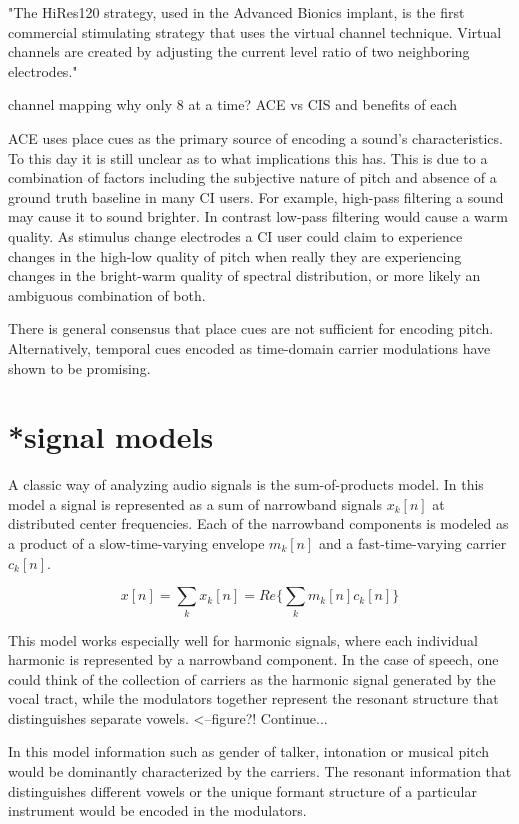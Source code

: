\documentclass [11pt, proquest] {uwthesis}[2015/03/03]
\begin{document}
"The HiRes120 strategy, used in the Advanced Bionics implant, is the first commercial stimulating strategy that uses the virtual channel technique. Virtual channels are created by adjusting the current level ratio of two neighboring electrodes."

channel mapping
	why only 8 at a time?
	ACE vs CIS and benefits of each
	
	
	
	ACE uses place cues as the primary source of encoding a sound's characteristics.  To this day it is still unclear as to what implications this has.  This is due to a combination of factors including the subjective nature of pitch and absence of a ground truth baseline in many CI users.  For example, high-pass filtering a sound may cause it to sound brighter.  In contrast low-pass filtering would cause a warm quality.  As stimulus change electrodes a CI user could claim to experience changes in the high-low quality of pitch when really they are experiencing changes in the bright-warm quality of spectral distribution, or more likely an ambiguous combination of both.

There is general consensus that place cues are not sufficient for encoding pitch.  Alternatively, temporal cues encoded as time-domain carrier modulations have shown to be promising.

\section{*signal models}

A classic way of analyzing audio signals is the sum-of-products model.  In this model a signal is represented as a sum of narrowband signals $x_k[n]$ at distributed center frequencies.  Each of the narrowband components is modeled as a product of a slow-time-varying envelope $m_k[n]$ and a fast-time-varying carrier $c_k[n]$.

$$x[n] = \sum\limits_k x_k[n] = Re\bigg\{ \sum\limits_k m_k[n] c_k[n] \bigg\}$$

This model works especially well for harmonic signals, where each individual harmonic is represented by a narrowband component.  In the case of speech, one could think of the collection of carriers as the harmonic signal generated by the vocal tract, while the modulators together represent the resonant structure that distinguishes separate vowels. <--figure?!  Continue...

In this model information such as gender of talker, intonation or musical pitch would be dominantly characterized by the carriers.  The resonant information that distinguishes different vowels or the unique formant structure of a particular instrument would be encoded in the modulators.
\end{document}
